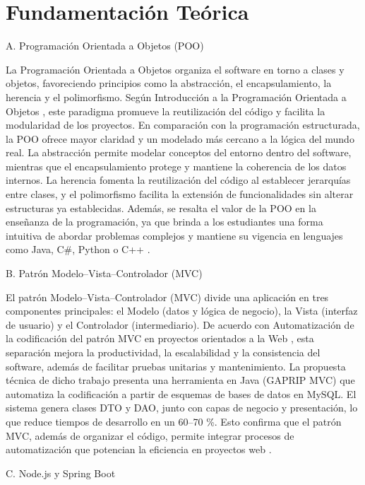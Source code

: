\section{Fundamentación Teórica}

A. Programación Orientada a Objetos (POO)

La Programación Orientada a Objetos organiza el software en torno a clases y objetos, favoreciendo principios como la abstracción, el encapsulamiento, la herencia y el polimorfismo. Según Introducción a la Programación Orientada a Objetos \cite{poo}, este paradigma promueve la reutilización del código y facilita la modularidad de los proyectos. En comparación con la programación estructurada, la POO ofrece mayor claridad y un modelado más cercano a la lógica del mundo real. La abstracción permite modelar conceptos del entorno dentro del software, mientras que el encapsulamiento protege y mantiene la coherencia de los datos internos. La herencia fomenta la reutilización del código al establecer jerarquías entre clases, y el polimorfismo facilita la extensión de funcionalidades sin alterar estructuras ya establecidas. Además, se resalta el valor de la POO en la enseñanza de la programación, ya que brinda a los estudiantes una forma intuitiva de abordar problemas complejos y mantiene su vigencia en lenguajes como Java, C\#, Python o C++ \cite{poo}.

B. Patrón Modelo–Vista–Controlador (MVC)

El patrón Modelo–Vista–Controlador (MVC) divide una aplicación en tres componentes principales: el Modelo (datos y lógica de negocio), la Vista (interfaz de usuario) y el Controlador (intermediario). De acuerdo con Automatización de la codificación del patrón MVC en proyectos orientados a la Web \cite{mvc}, esta separación mejora la productividad, la escalabilidad y la consistencia del software, además de facilitar pruebas unitarias y mantenimiento. La propuesta técnica de dicho trabajo presenta una herramienta en Java (GAPRIP MVC) que automatiza la codificación a partir de esquemas de bases de datos en MySQL. El sistema genera clases DTO y DAO, junto con capas de negocio y presentación, lo que reduce tiempos de desarrollo en un 60–70 \%. Esto confirma que el patrón MVC, además de organizar el código, permite integrar procesos de automatización que potencian la eficiencia en proyectos web \cite{mvc}.

C. Node.js y Spring Boot

